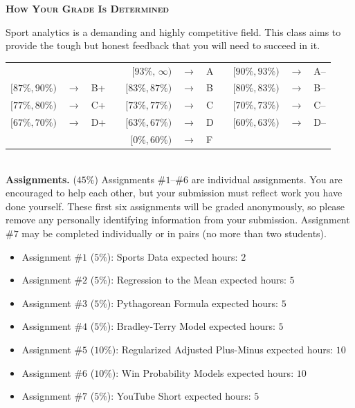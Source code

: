 \documentclass[11pt]{article}
\begin{document}
\newpage
\textbf{\textsc{How Your Grade Is Determined}}
\begin{adjustwidth}{1cm}{0cm}
	Sport analytics is a demanding and highly competitive field. This class aims to provide the tough but honest feedback that you will need to succeed in it.
  \begin{center}
    \begin{tabular}{rclcrclcrcl}
                      &               &     & & $[93\%,\,\infty)$ & $\rightarrow$ & A & & $[90\%, 93\%)$ & $\rightarrow$	& A--\\
      $[87\%, 90\%)$  & $\rightarrow$	& B+  & & $[83\%, 87\%)$  & $\rightarrow$ & B & & $[80\%, 83\%)$ & $\rightarrow$	& B--\\
      $[77\%, 80\%)$  & $\rightarrow$	& C+  & & $[73\%, 77\%)$  & $\rightarrow$ & C & & $[70\%, 73\%)$ & $\rightarrow$	& C--\\
      $[67\%, 70\%)$  & $\rightarrow$	& D+  & & $[63\%, 67\%)$  & $\rightarrow$ & D & & $[60\%, 63\%)$ & $\rightarrow$  & D--\\
                      &               &     & & $[ 0\%, 60\%)$  & $\rightarrow$ & F\\
    \end{tabular}
  \end{center}
  ~\\
	\textbf{Assignments.} ($45\%$) Assignments \#$1$--\#$6$ are individual assignments. You are encouraged to help each other, but your submission must reflect work you have done yourself. These first six assignments will be graded anonymously, so please remove any personally identifying information from your submission. Assignment \#$7$ may be completed individually or in pairs (no more than two students).
  \begin{itemize}
    \item Assignment \#$1$ ($5\%$): Sports Data                       \hfill  expected hours: $2$
    \item Assignment \#$2$ ($5\%$): Regression to the Mean            \hfill  expected hours: $5$
    \item Assignment \#$3$ ($5\%$): Pythagorean Formula               \hfill  expected hours: $5$
    \item Assignment \#$4$ ($5\%$): Bradley-Terry Model               \hfill  expected hours: $5$
    \item Assignment \#$5$ ($10\%$): Regularized Adjusted Plus-Minus  \hfill  expected hours: $10$
    \item Assignment \#$6$ ($10\%$): Win Probability Models           \hfill  expected hours: $10$
    \item Assignment \#$7$ ($5\%$): YouTube Short                     \hfill  expected hours: $5$
  \end{itemize}


\end{adjustwidth}
\end{document}
